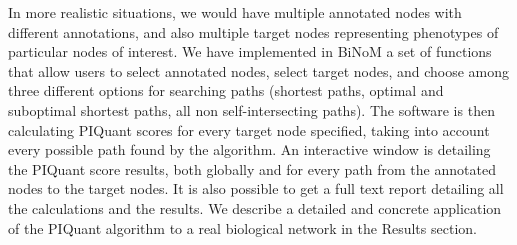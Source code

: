 \documentclass[10pt]{bmc_article}
\newenvironment{bmcformat}{\baselineskip20pt\sloppy\setboolean{publ}{false}}{\baselineskip20pt\sloppy}
\begin{document}
\begin{bmcformat}
% 
% 
% 
% 
% 

In more realistic situations, we would have multiple annotated nodes with different
 annotations, and also multiple target nodes representing phenotypes of
particular nodes of interest. We have implemented in BiNoM a set of functions
that allow users to select annotated nodes, select target nodes, and choose among
three different options for searching paths (shortest paths, optimal and
suboptimal shortest paths, all non self-intersecting paths). The software is then
calculating PIQuant scores for every target node specified, taking into account
every possible path found by the algorithm. An interactive window is detailing
the PIQuant score results, both globally and for every path from the annotated
nodes to the target nodes. It is also possible to get a full text report
detailing all the calculations and the results. We describe a detailed
and concrete application of the PIQuant algorithm to a real biological network
in the Results section.


\end{bmcformat}
\end{document}
